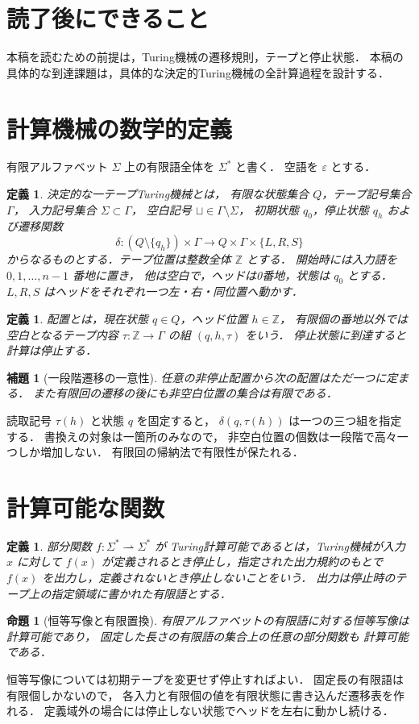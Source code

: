 \documentclass[a5paper,10pt,onecolumn]{jsarticle}
\makeatletter
\theoremstyle{mathnotetheorem}
\newtheorem{definition}[theorem]{定義}
\newtheorem{lemma}[theorem]{補題}
\newtheorem{proposition}[theorem]{命題}
\renewcommand{\proofname}{証明}
\renewenvironment{proof}[1][\proofname]{%
  \par\pushQED{\qed}\normalfont\topsep4\p@\@plus2\p@\relax
  \trivlist\item[\hskip\labelsep\bfseries #1]\ignorespaces
}{\popQED\endtrivlist\@endpefalse}
\makeatother
\begin{document}
\section*{読了後にできること}
本稿を読むための前提は，Turing機械の遷移規則，テープと停止状態．
本稿の具体的な到達課題は，具体的な決定的Turing機械の全計算過程を設計する．

\section{計算機械の数学的定義}
有限アルファベット $\Sigma$ 上の有限語全体を $\Sigma^*$ と書く．
空語を $\varepsilon$ とする．
\begin{definition}
決定的な一テープTuring機械とは，
有限な状態集合 $Q$，テープ記号集合 $\Gamma$，
入力記号集合 $\Sigma\subset\Gamma$，
空白記号 $\sqcup\in\Gamma\setminus\Sigma$，
初期状態 $q_0$，停止状態 $q_h$ および遷移関数
\[
 \delta:(Q\setminus\{q_h\})\times\Gamma
 \longrightarrow Q\times\Gamma\times\{L,R,S\}
\]
からなるものとする．テープ位置は整数全体 $\mathbb Z$ とする．
開始時には入力語を $0,1,\ldots,n-1$ 番地に置き，
他は空白で，ヘッドは0番地，状態は $q_0$ とする．
$L,R,S$ はヘッドをそれぞれ一つ左・右・同位置へ動かす．
\end{definition}
\begin{definition}
配置とは，現在状態 $q\in Q$，ヘッド位置 $h\in\mathbb Z$，
有限個の番地以外では空白となるテープ内容
$\tau:\mathbb Z\to\Gamma$ の組 $(q,h,\tau)$ をいう．
停止状態に到達すると計算は停止する．
\end{definition}
\begin{lemma}[一段階遷移の一意性]
任意の非停止配置から次の配置はただ一つに定まる．
また有限回の遷移の後にも非空白位置の集合は有限である．
\end{lemma}
\begin{proof}
読取記号 $\tau(h)$ と状態 $q$ を固定すると，
$\delta(q,\tau(h))$ は一つの三つ組を指定する．
書換えの対象は一箇所のみなので，
非空白位置の個数は一段階で高々一つしか増加しない．
有限回の帰納法で有限性が保たれる．
\end{proof}
\section{計算可能な関数}
\begin{definition}
部分関数 $f:\Sigma^*\rightharpoonup\Sigma^*$ が
Turing計算可能であるとは，Turing機械が入力 $x$ に対して
$f(x)$ が定義されるとき停止し，指定された出力規約のもとで
$f(x)$ を出力し，定義されないとき停止しないことをいう．
出力は停止時のテープ上の指定領域に書かれた有限語とする．
\end{definition}
\begin{proposition}[恒等写像と有限置換]
有限アルファベットの有限語に対する恒等写像は計算可能であり，
固定した長さの有限語の集合上の任意の部分関数も
計算可能である．
\end{proposition}
\begin{proof}
恒等写像については初期テープを変更せず停止すればよい．
固定長の有限語は有限個しかないので，
各入力と有限個の値を有限状態に書き込んだ遷移表を作れる．
定義域外の場合には停止しない状態でヘッドを左右に動かし続ける．
\end{proof}
\end{document}
